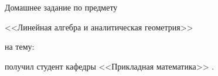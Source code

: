 ﻿\documentclass[a4paper, 14pt]{extarticle}
\begin{document}
       


\onehalfspacing

	\begin{center}
		\large
		Домашнее задание \textnumero \thefifteencount{} по предмету 
		
		<<Линейная алгебра и аналитическая геометрия>>

		на тему: \Theme	

		получил студент кафедры <<Прикладная математика>> \GetName.
	\end{center}

	\tableofcontents\label{sec:toc}%
	\clearpage

	
\end{document}
